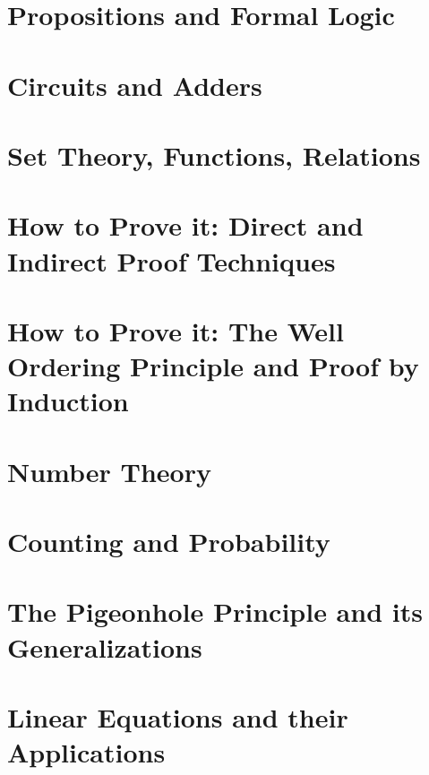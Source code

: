 



\frontmatter
\tableofcontents*

\mainmatter

\chapter{Propositions and Formal Logic}


\chapter{Circuits and Adders}


\chapter{Set Theory, Functions, Relations}


\chapter{How to Prove it: Direct and Indirect Proof Techniques}


\chapter{How to Prove it: The Well Ordering Principle and Proof by Induction}


\chapter{Number Theory}


\chapter{Counting and Probability}


\chapter{The Pigeonhole Principle and its Generalizations}


\chapter{Linear Equations and their Applications}


\backmatter
{}
\nocite{*}


